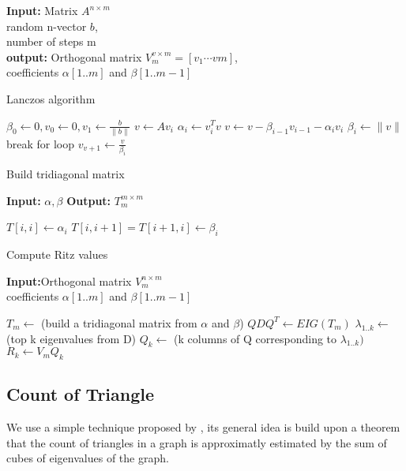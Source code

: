 \begin{algorithm}
{\bf Input:} Matrix $A^{n \times m}$\\
random n-vector $b$,\\
number of steps m\\
{\bf output:} Orthogonal matrix $ V^{v \times m}_{m} = [v_{1}\cdots v{m}]$,\\
coefficients $\alpha[1..m]$ and $\beta[1..m-1]$
\begin{algorithmic}[1]
\caption{Lanczos algorithm}
\STATE $\beta_{0} \leftarrow 0, v_{0} \leftarrow 0, v_{1} \leftarrow \frac{b}{\parallel b \parallel}$ 
	\STATE $v \leftarrow Av_{i}$
	\STATE $\alpha_{i} \leftarrow v^{T}_{i}v $
	\STATE $v \leftarrow v - \beta_{i-1}v_{i-1} - \alpha_{i}v_{i}$
	\STATE $\beta_{i} \leftarrow \parallel v\parallel $
	\STATE break for loop 
	\ENDIF
	\STATE $ v_{v+1} \leftarrow \frac{v}{\beta_{i}} $
\ENDFOR
\end{algorithmic}
\label{eigen:algo1}
\end{algorithm}

\begin{algorithm}
\caption{Build tridiagonal matrix}
{\bf Input:} $\alpha, \beta$
{\bf Output:} $T^{m\times m}_{m}$
\begin{algorithmic}[1]
	\STATE $T[i, i] \leftarrow \alpha_{i} $
	\STATE $T[i, i+1] = T[i+1, i] \leftarrow \beta_{i}$
\ENDFOR	
\end{algorithmic}
\label{eigen:algo2}
\end{algorithm}

\begin{algorithm}
\caption{Compute Ritz values}
{\bf Input:}Orthogonal matrix $V^{n\times m}_{m}$\\
coefficients $\alpha[1..m]$ and $\beta[1..m-1]$
\begin{algorithmic}[1]
\STATE $T_{m} \leftarrow$ (build a tridiagonal matrix from $\alpha$ and $\beta$)
\STATE $QDQ^{T} \leftarrow EIG(T_{m})$
\STATE $\lambda_{1..k} \leftarrow$ (top k eigenvalues from D)
\STATE $Q_{k} \leftarrow $ (k columns of Q corresponding to $\lambda_{1..k})$
\STATE $R_{k} \leftarrow V_{m}Q_{k}$
\end{algorithmic}
\label{eigen:algo3}
\end{algorithm}

\subsection{Count of Triangle}
We use a simple technique proposed by \cite{tsourakakis2008fast}, its general idea is build upon a theorem that the count of triangles in a graph is approximatly estimated by the sum of cubes of eigenvalues of the graph. 

